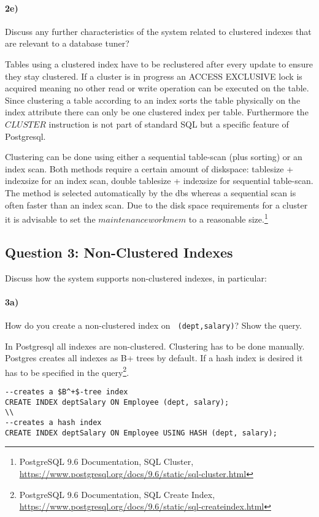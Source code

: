 \documentclass[11pt]{scrartcl}
\begin{document}
\paragraph{2e)} Discuss any further characteristics of the system
related to clustered indexes that are relevant to a database
tuner?

Tables using a clustered index have to be reclustered after every update to ensure they stay clustered.
If a cluster is in progress an ACCESS EXCLUSIVE lock is acquired meaning no other read or write operation can be executed
on the table.
Since clustering a table according to an index sorts the table physically on the index attribute there can only be one clustered index per table.
Furthermore the $CLUSTER$ instruction is not part of standard SQL but a specific feature of Postgresql.

Clustering can be done using either a sequential table-scan (plus sorting) or an index scan. Both methods require a certain amount of diskspace: tablesize + indexsize for an index scan, double tablesize + indexsize for sequential table-scan.
The method is selected automatically by the dbs whereas a sequential scan is often faster than an index scan. Due to the disk space requirements for a cluster it is advisable to set the $maintenance work mem$ to a reasonable size.\footnote{PostgreSQL 9.6
  Documentation, SQL Cluster,
  \url{https://www.postgresql.org/docs/9.6/static/sql-cluster.html}}

\subsection*{Question 3: Non-Clustered Indexes}

Discuss how the system supports non-clustered indexes, in
particular:

\paragraph{3a)} How do you create a non-clustered index on {\tt
  (dept,salary)}? Show the query.

In Postgresql all indexes are non-clustered. Clustering has to be done manually.
Postgres creates all indexes as B+ trees by default. If a hash index is desired it has to be specified in the query\footnote{PostgreSQL 9.6
  Documentation, SQL Create Index,
  \url{https://www.postgresql.org/docs/9.6/static/sql-createindex.html}}.

{\small
\begin{verbatim}
--creates a $B^+$-tree index
CREATE INDEX deptSalary ON Employee (dept, salary);
\\
--creates a hash index
CREATE INDEX deptSalary ON Employee USING HASH (dept, salary);
\end{verbatim}
}
\end{document}
